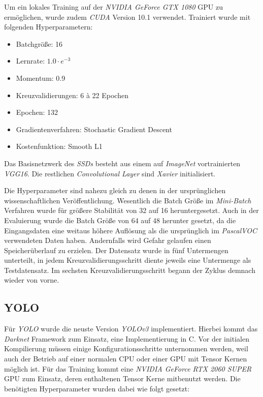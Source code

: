Um ein lokales Training auf der \textit{NVIDIA GeForce GTX 1080} GPU zu ermöglichen, wurde zudem \textit{CUDA} Version 10.1 verwendet. Trainiert wurde mit folgenden Hyperparametern:
\begin{itemize}
	\item Batchgröße: 16
	\item Lernrate: $1.0\cdot e^{-3}$
	\item Momentum: 0.9
	\item Kreuzvalidierungen: 6 à 22 Epochen
	\item Epochen: 132
	\item Gradientenverfahren: Stochastic Gradient Descent
	\item Kostenfunktion: Smooth L1
\end{itemize}

Das Basisnetzwerk des \textit{SSDs} besteht aus einem auf \textit{ImageNet} vortrainierten \textit{VGG16}. Die restlichen \textit{Convolutional Layer} sind \textit{Xavier} initialisiert. 

Die Hyperparameter sind nahezu gleich zu denen in der ursprünglichen wissenschaftlichen Veröffentlichung. Wesentlich die Batch Größe im \textit{Mini-Batch} Verfahren wurde für größere Stabilität von 32 auf 16 heruntergesetzt. Auch in der Evaluierung wurde die Batch Größe von 64 auf 48 herunter gesetzt, da die Eingangsdaten eine weitaus höhere Auflösung als die ursprünglich im \textit{PascalVOC} verwendeten Daten haben. Andernfalls wird Gefahr gelaufen einen Speicherüberlauf zu erzielen. Der Datensatz wurde in fünf Untermengen unterteilt, in jedem Kreuzvalidierungsschritt diente jeweils eine Untermenge als Testdatensatz. Im sechsten Kreuzvalidierungsschritt begann der Zyklus demnach wieder von vorne. 

\subsection*{YOLO}

Für \textit{YOLO} wurde die neuste Version \textit{YOLOv3} implementiert. Hierbei kommt das \textit{Darknet} Framework zum Einsatz, eine Implementierung in C. Vor der initialen Kompilierung müssen einige Konfigurationsschritte unternommen werden, weil auch der Betrieb auf einer normalen CPU oder einer GPU mit Tensor Kernen möglich ist. Für das Training kommt eine \textit{NVIDIA GeForce RTX 2060 SUPER} GPU zum Einsatz, deren enthaltenen Tensor Kerne mitbenutzt werden. Die benötigten Hyperparameter wurden dabei wie folgt gesetzt:

